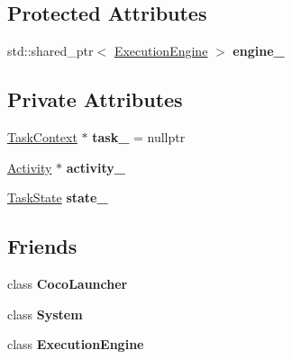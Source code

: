 \subsection*{Protected Attributes}
\begin{DoxyCompactItemize}
\item 
\hypertarget{classcoco_1_1_task_context_a7f6706f1339e8c6e8972c3c9244d5efe}{}std\+::shared\+\_\+ptr$<$ \hyperlink{classcoco_1_1_execution_engine}{Execution\+Engine} $>$ {\bfseries engine\+\_\+}\label{classcoco_1_1_task_context_a7f6706f1339e8c6e8972c3c9244d5efe}

\end{DoxyCompactItemize}
\subsection*{Private Attributes}
\begin{DoxyCompactItemize}
\item 
\hypertarget{classcoco_1_1_task_context_a5b1506d61f6433cb68e7c2dbf0be1c1f}{}\hyperlink{classcoco_1_1_task_context}{Task\+Context} $\ast$ {\bfseries task\+\_\+} = nullptr\label{classcoco_1_1_task_context_a5b1506d61f6433cb68e7c2dbf0be1c1f}

\item 
\hypertarget{classcoco_1_1_task_context_a3e64c0ed592191c264ccb5705e17dfcc}{}\hyperlink{classcoco_1_1_activity}{Activity} $\ast$ {\bfseries activity\+\_\+}\label{classcoco_1_1_task_context_a3e64c0ed592191c264ccb5705e17dfcc}

\item 
\hypertarget{classcoco_1_1_task_context_a47d34de836289ab6a137c8e0d584bcc0}{}\hyperlink{namespacecoco_afec53814046619bac93c2077706a6bd1}{Task\+State} {\bfseries state\+\_\+}\label{classcoco_1_1_task_context_a47d34de836289ab6a137c8e0d584bcc0}

\end{DoxyCompactItemize}
\subsection*{Friends}
\begin{DoxyCompactItemize}
\item 
\hypertarget{classcoco_1_1_task_context_ab80f178dab101a5299f5ebd3d78bef93}{}class {\bfseries Coco\+Launcher}\label{classcoco_1_1_task_context_ab80f178dab101a5299f5ebd3d78bef93}

\item 
\hypertarget{classcoco_1_1_task_context_af18a9ee98e70982bfe2975391d7221a5}{}class {\bfseries System}\label{classcoco_1_1_task_context_af18a9ee98e70982bfe2975391d7221a5}

\item 
\hypertarget{classcoco_1_1_task_context_a9b68196ad6ed6fa11eb4454434b39bb5}{}class {\bfseries Execution\+Engine}\label{classcoco_1_1_task_context_a9b68196ad6ed6fa11eb4454434b39bb5}

\end{DoxyCompactItemize}


